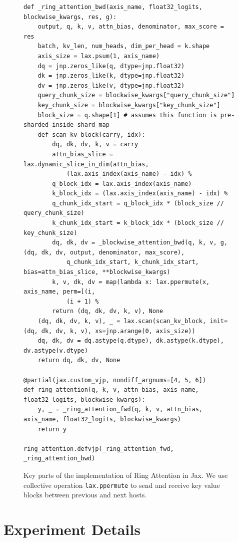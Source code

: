 \documentclass{article}
\newcommand{\ours}{{Ring Attention}\xspace}
\begin{document}
\begin{figure}[!htbp]
\begin{verbatim}
def _ring_attention_bwd(axis_name, float32_logits, blockwise_kwargs, res, g):
    output, q, k, v, attn_bias, denominator, max_score = res
    batch, kv_len, num_heads, dim_per_head = k.shape
    axis_size = lax.psum(1, axis_name)
    dq = jnp.zeros_like(q, dtype=jnp.float32)
    dk = jnp.zeros_like(k, dtype=jnp.float32)
    dv = jnp.zeros_like(v, dtype=jnp.float32)
    query_chunk_size = blockwise_kwargs["query_chunk_size"]
    key_chunk_size = blockwise_kwargs["key_chunk_size"]
    block_size = q.shape[1] # assumes this function is pre-sharded inside shard_map
    def scan_kv_block(carry, idx):
        dq, dk, dv, k, v = carry
        attn_bias_slice = lax.dynamic_slice_in_dim(attn_bias,
            (lax.axis_index(axis_name) - idx) %
        q_block_idx = lax.axis_index(axis_name)
        k_block_idx = (lax.axis_index(axis_name) - idx) %
        q_chunk_idx_start = q_block_idx * (block_size // query_chunk_size)
        k_chunk_idx_start = k_block_idx * (block_size // key_chunk_size)
        dq, dk, dv = _blockwise_attention_bwd(q, k, v, g, (dq, dk, dv, output, denominator, max_score),
            q_chunk_idx_start, k_chunk_idx_start, bias=attn_bias_slice, **blockwise_kwargs)
        k, v, dk, dv = map(lambda x: lax.ppermute(x, axis_name, perm=[(i,
            (i + 1) %
        return (dq, dk, dv, k, v), None
    (dq, dk, dv, k, v), _ = lax.scan(scan_kv_block, init=(dq, dk, dv, k, v), xs=jnp.arange(0, axis_size))
    dq, dk, dv = dq.astype(q.dtype), dk.astype(k.dtype), dv.astype(v.dtype)
    return dq, dk, dv, None

@partial(jax.custom_vjp, nondiff_argnums=[4, 5, 6])
def ring_attention(q, k, v, attn_bias, axis_name, float32_logits, blockwise_kwargs):
    y, _ = _ring_attention_fwd(q, k, v, attn_bias, axis_name, float32_logits, blockwise_kwargs)
    return y

ring_attention.defvjp(_ring_attention_fwd, _ring_attention_bwd)
\end{verbatim}
\vspace{-0.5em}
\caption{Key parts of the implementation of \ours in Jax. We use collective operation \texttt{lax.ppermute} to send and receive key value blocks between previous and next hosts.}
\label{fig:jax_code}
\vspace{-1em}
\end{figure}



\section{Experiment Details}
\end{document}

